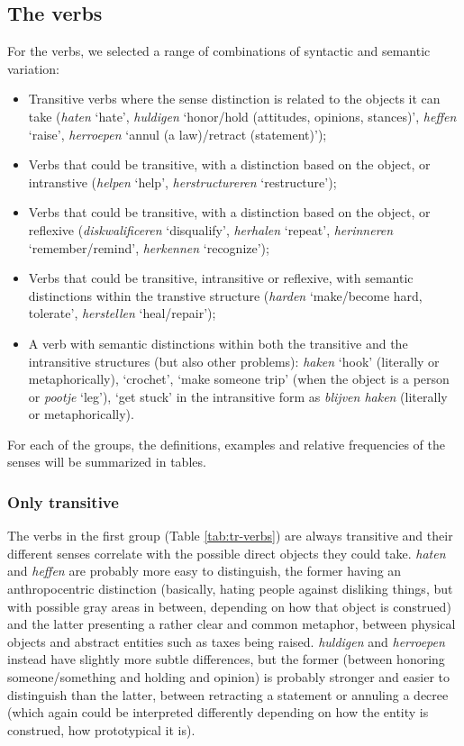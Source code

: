 \documentclass[
]{book}
\begin{document}
\hypertarget{verbs}{%
\subsection{The verbs}\label{verbs}}

For the verbs, we selected a range of combinations of syntactic and semantic variation:

\begin{itemize}
\item
  Transitive verbs where the sense distinction is related to the objects it can take (\emph{haten} `hate', \emph{huldigen} `honor/hold (attitudes, opinions, stances)', \emph{heffen} `raise', \emph{herroepen} `annul (a law)/retract (statement)');
\item
  Verbs that could be transitive, with a distinction based on the object, or intranstive (\emph{helpen} `help', \emph{herstructureren} `restructure');
\item
  Verbs that could be transitive, with a distinction based on the object, or reflexive (\emph{diskwalificeren} `disqualify', \emph{herhalen} `repeat', \emph{herinneren} `remember/remind', \emph{herkennen} `recognize');
\item
  Verbs that could be transitive, intransitive or reflexive, with semantic distinctions within the transtive structure (\emph{harden} `make/become hard, tolerate', \emph{herstellen} `heal/repair');
\item
  A verb with semantic distinctions within both the transitive and the intransitive structures (but also other problems): \emph{haken} `hook' (literally or metaphorically), `crochet', `make someone trip' (when the object is a person or \emph{pootje} `leg'), `get stuck' in the intransitive form as \emph{blijven haken} (literally or metaphorically).
\end{itemize}

For each of the groups, the definitions, examples and relative frequencies of the senses will be summarized in tables.

\hypertarget{only-transitive}{%
\subsubsection{Only transitive}\label{only-transitive}}

The verbs in the first group (Table \ref{tab:tr-verbs}) are always transitive and their different senses correlate with the possible direct objects they could take. \emph{haten} and \emph{heffen} are probably more easy to distinguish, the former having an anthropocentric distinction (basically, hating people against disliking things, but with possible gray areas in between, depending on how that object is construed) and the latter presenting a rather clear and common metaphor, between physical objects and abstract entities such as taxes being raised. \emph{huldigen} and \emph{herroepen} instead have slightly more subtle differences, but the former (between honoring someone/something and holding and opinion) is probably stronger and easier to distinguish than the latter, between retracting a statement or annuling a decree (which again could be interpreted differently depending on how the entity is construed, how prototypical it is).
\end{document}
